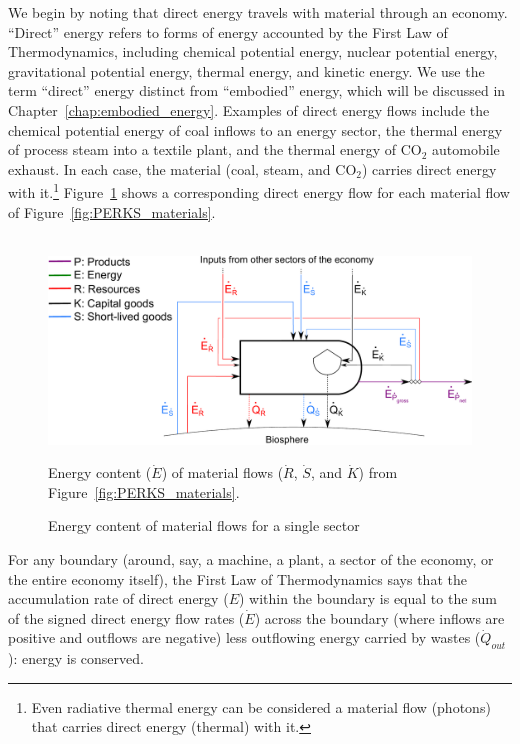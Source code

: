We begin by noting that direct energy travels 
with material through an economy.
``Direct'' energy refers to forms of energy accounted by the 
First Law of Thermodynamics,
including chemical potential energy, 
nuclear potential energy, 
gravitational potential energy,
thermal energy, 
and kinetic energy.
We use the term ``direct'' energy distinct from ``embodied'' energy, 
which will be discussed in Chapter~\ref{chap:embodied_energy}.
Examples of direct energy flows include 
the chemical potential energy of coal inflows to an energy sector, 
the thermal energy of process steam into a textile plant, and
the thermal energy of CO$_2$ automobile exhaust.
In each case, the material (coal, steam, and CO$_2$) 
carries direct energy with it.\footnote{Even 
radiative thermal energy
can be considered a material flow (photons) that carries
direct energy (thermal) with it.}
Figure~\ref{fig:PERKS_energy_content} shows a corresponding 
direct energy flow for each material flow of Figure~\ref{fig:PERKS_materials}.

\begin{figure}[!ht]
\centering\
\includegraphics[width=0.8\linewidth]{Part_2/Chapter_Energy/images/PERKS_basic_unit_energy_content.pdf}
\caption{Energy content of material flows for a single sector}{Energy content ($\dot{E}$) of material flows 
($\dot{R}$, $\dot{S}$, and $\dot{K}$) 
from Figure~\ref{fig:PERKS_materials}.}
\label{fig:PERKS_energy_content}
\end{figure}

For any boundary (around, say, a machine, a plant,
a sector of the economy, or the entire economy itself), 
the First Law of Thermodynamics says that 
the accumulation rate 
of direct energy ($E$)
within the boundary
is equal to the sum of the signed direct energy flow rates 
($\dot{E}$)
across the boundary (where inflows are positive and outflows are negative)
less outflowing energy carried by wastes 
($\dot{Q}_{out}$): 
energy is conserved.

